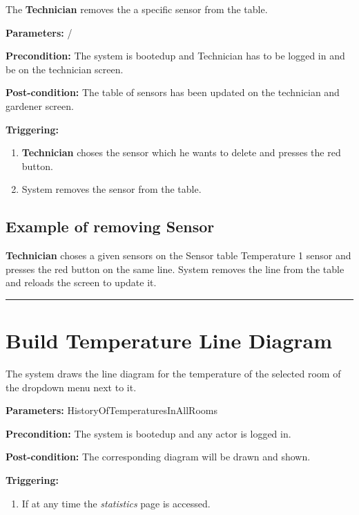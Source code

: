 The \textbf{Technician} removes the a specific sensor from the table.
\begin{description}

\item \textbf{Parameters:} /
\item \textbf{Precondition:} The system is bootedup and Technician has to be
logged in and be on the technician screen.
\item \textbf{Post-condition:} The table of sensors has been updated on the
technician and gardener screen.

\item \textbf{Triggering:}
\begin{enumerate}
\item \textbf{Technician} choses the sensor which he wants to delete and presses
the red button.
\item System removes the sensor from the table.
\end{enumerate}
\end{description}

\subsection{Example of removing Sensor}
\textbf{Technician} choses a given sensors on the Sensor table Temperature 1
sensor and presses the red button on the same line.
System removes the line from the table and reloads the screen to update it.

 \hfill
\vspace{0.5cm}
\hrule



\break
\section{Build Temperature Line Diagram}
\label{operation:BuildTemperatureDiagram}
The system draws the line diagram for the temperature of the selected room of
the dropdown menu next to it.

\begin{description}

\item \textbf{Parameters:} HistoryOfTemperaturesInAllRooms
\item \textbf{Precondition:} The system is bootedup and any actor is logged in.
\item \textbf{Post-condition:} The corresponding diagram will be drawn and
shown.

\item \textbf{Triggering:}
\begin{enumerate}
\item If at any time the \emph{statistics} page is accessed.
\end{enumerate}
\end{description}

